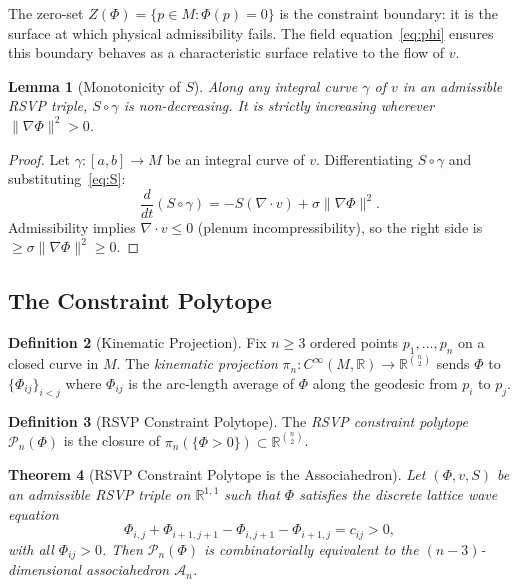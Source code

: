 \documentclass[12pt, oneside]{amsart}
\theoremstyle{plain}
\newtheorem{theorem}{Theorem}[section]
\newtheorem{lemma}[theorem]{Lemma}
\theoremstyle{definition}
\newtheorem{definition}[theorem]{Definition}
\theoremstyle{remark}
\newcommand{\R}{\mathbb{R}}
\newcommand{\Phif}{\Phi}   %
\newcommand{\vf}{v}         %
\newcommand{\Sf}{S}         %
\newcommand{\Assoc}{\mathcal{A}_n}
\begin{document}
The zero-set $Z(\Phif) = \{p \in M : \Phif(p) = 0\}$ is the constraint boundary: it is the surface at which physical admissibility fails. The field equation~\eqref{eq:phi} ensures this boundary behaves as a characteristic surface relative to the flow of $\vf$.

\begin{lemma}[Monotonicity of $\Sf$]
\label{lem:S-monotone}
Along any integral curve $\gamma$ of $\vf$ in an admissible RSVP triple, $\Sf \circ \gamma$ is non-decreasing. It is strictly increasing wherever $\|\nabla\Phif\|^2 > 0$.
\end{lemma}

\begin{proof}
Let $\gamma: [a,b] \to M$ be an integral curve of $\vf$. Differentiating $\Sf \circ \gamma$ and substituting~\eqref{eq:S}:
\[
  \frac{d}{dt}(\Sf \circ \gamma) = -\Sf(\nabla \cdot \vf) + \sigma\|\nabla\Phif\|^2.
\]
Admissibility implies $\nabla \cdot \vf \leq 0$ (plenum incompressibility), so the right side is $\geq \sigma\|\nabla\Phif\|^2 \geq 0$.
\end{proof}

\subsection{The Constraint Polytope}

\begin{definition}[Kinematic Projection]
\label{def:kinematic-proj}
Fix $n \geq 3$ ordered points $p_1, \ldots, p_n$ on a closed curve in $M$. The \emph{kinematic projection} $\pi_n: C^\infty(M,\R) \to \R^{\binom{n}{2}}$ sends $\Phif$ to $\{\Phif_{ij}\}_{i < j}$ where $\Phif_{ij}$ is the arc-length average of $\Phif$ along the geodesic from $p_i$ to $p_j$.
\end{definition}

\begin{definition}[RSVP Constraint Polytope]
The \emph{RSVP constraint polytope} $\mathcal{P}_n(\Phif)$ is the closure of $\pi_n(\{\Phif > 0\}) \subset \R^{\binom{n}{2}}$.
\end{definition}

\begin{theorem}[RSVP Constraint Polytope is the Associahedron]
\label{thm:assoc}
Let $(\Phif, \vf, \Sf)$ be an admissible RSVP triple on $\R^{1,1}$ such that $\Phif$ satisfies the discrete lattice wave equation
\begin{equation}
\label{eq:lattice-wave}
  \Phif_{i,j} + \Phif_{i+1,j+1} - \Phif_{i,j+1} - \Phif_{i+1,j} = c_{ij} > 0,
\end{equation}
with all $\Phif_{ij} > 0$. Then $\mathcal{P}_n(\Phif)$ is combinatorially equivalent to the $(n-3)$-dimensional associahedron $\Assoc$.
\end{theorem}
\end{document}
